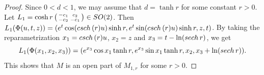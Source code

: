 \documentclass[10pt,a4paper]{amsart}
\begin{document}
\begin{proof}
		Since $0<d<1$, we may assume that $d=\tanh r$ for some constant $r>0$.
		Let $L_1=
		\cosh r \left(\begin{smallmatrix}
			-c_1 & c_2 \\
			-c_2 & -c_1 \\
		\end{smallmatrix}\right)
		\in {\rm SO(2)}$.
		Then $L_1(\Phi(u,t,z))=(e^t\cos ({\rm csch}\, (r) u)\sinh r,
		e^t\sin ({\rm csch}\, (r) u)\sinh r,z,t)$.
		By taking the reparametrization $x_1={\rm csch}\, (r) u$, $x_2=z$
		and $x_3=t-\ln({\rm sech}\, r)$, we get
		$$
		L_1(\Phi(x_1,x_2,x_3))=(e^{x_3}\cos x_1\tanh r,e^{x_3}\sin x_1\tanh r,
		x_2,x_3+\ln({\rm sech}\, r)).
		$$
		This shows that $M$ is an open part of $M_{1,r}$ for some $r>0$.
	\end{proof}
\end{document}
